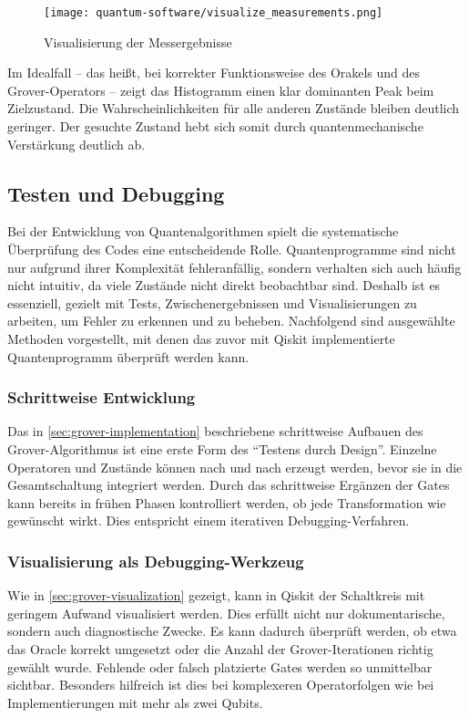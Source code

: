 \begin{figure}
    \centering
    \texttt{[image: quantum-software/visualize\_measurements.png]}
    \caption{Visualisierung der Messergebnisse}
    \label{fig:visualize-measure}
\end{figure}

Im Idealfall – das heißt, bei korrekter Funktionsweise des Orakels und des Grover-Operators – zeigt das Histogramm einen klar dominanten Peak beim Zielzustand.  Die Wahrscheinlichkeiten für alle anderen Zustände bleiben deutlich geringer.  Der gesuchte Zustand hebt sich somit durch quantenmechanische Verstärkung deutlich ab.

\subsection{Testen und Debugging}

Bei der Entwicklung von Quantenalgorithmen spielt die systematische Überprüfung des Codes eine entscheidende Rolle. Quantenprogramme sind nicht nur aufgrund ihrer Komplexität fehleranfällig, sondern verhalten sich auch häufig nicht intuitiv, da viele Zustände nicht direkt beobachtbar sind. Deshalb ist es essenziell, gezielt mit Tests, Zwischenergebnissen und Visualisierungen zu arbeiten, um Fehler zu erkennen und zu beheben. Nachfolgend sind ausgewählte Methoden vorgestellt, mit denen das zuvor mit Qiskit implementierte Quantenprogramm überprüft werden kann.

\subsubsection*{Schrittweise Entwicklung}
Das in \autoref{sec:grover-implementation} beschriebene schrittweise Aufbauen des Grover-Algorithmus ist eine erste Form des \enquote{Testens durch Design}. Einzelne Operatoren und Zustände können nach und nach erzeugt werden, bevor sie in die Gesamtschaltung integriert werden. Durch das schrittweise Ergänzen der Gates kann bereits in frühen Phasen kontrolliert werden, ob jede Transformation wie gewünscht wirkt. Dies entspricht einem iterativen Debugging-Verfahren.

\subsubsection*{Visualisierung als Debugging-Werkzeug}

Wie in \autoref{sec:grover-visualization} gezeigt, kann in Qiskit der Schaltkreis mit geringem Aufwand visualisiert werden. Dies erfüllt nicht nur dokumentarische, sondern auch diagnostische Zwecke. Es kann dadurch überprüft werden, ob etwa das Oracle korrekt umgesetzt oder die Anzahl der Grover-Iterationen richtig gewählt wurde. Fehlende oder falsch platzierte Gates werden so unmittelbar sichtbar. Besonders hilfreich ist dies bei komplexeren Operatorfolgen wie bei Implementierungen mit mehr als zwei Qubits.

